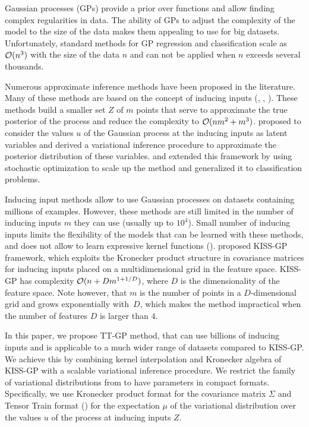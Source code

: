 Gaussian processes (GPs) provide a prior over functions and allow finding complex
regularities in data. The ability of GPs to adjust the complexity of the model
to the size of the data makes them appealing to use for big datasets.
Unfortunately, standard methods for GP regression and classification scale as
$\mathcal{O}(n^3)$ with the size of the data $n$ and can not be applied when $n$
exceeds several thousands.

Numerous approximate inference methods have been proposed in the literature. Many
of these methods are based on the concept of inducing inputs (\citet{candela2005},
\citet{snelson2006}, \citet{williams2000}). These methods build a smaller set
$Z$ of $m$ points that serve to approximate the true posterior of the process
and reduce the complexity to $\mathcal{O}(nm^2 + m^3)$. \citet{titsias2009} proposed
to consider the values $u$ of the Gaussian process at the inducing inputs
as latent variables and derived a variational inference procedure to approximate
the posterior distribution of these variables. \citet{hensman2013} and
\citet{hensman2015} extended this framework by using stochastic optimization to
scale up the method and generalized it to classification problems.

Inducing input methods allow to use Gaussian processes on datasets containing
millions of examples. However, these methods are still limited in the number
of inducing inputs $m$ they can use (usually up to $10^4$). Small number of 
inducing inputs limits the flexibility of the models that can be learned with 
these methods, and does not allow to learn expressive kernel functions 
(\citet{wilson2014}). \citet{wilson2015} proposed KISS-GP
framework, which exploits the Kronecker product structure in covariance matrices
for inducing inputs placed on a multidimensional grid in the feature space.
KISS-GP has complexity $\mathcal{O}(n + D m^{1 + 1/D})$, where $D$ is the dimensionality
of the feature space. Note however, that $m$ is the number of points in a
$D$-dimensional grid and grows exponentially with~$D$, which makes the method
impractical when the number of features $D$ is larger than $4$.

In this paper, we propose TT-GP method, that can use billions of inducing
inputs and is applicable to a much wider range of datasets compared to
KISS-GP.
We achieve this by combining kernel interpolation and Kronecker algebra of 
KISS-GP with a scalable variational inference procedure. We restrict the family of
variational distributions from \citet{hensman2013} to have parameters in
compact formats. Specifically, we use Kronecker product format for the
covariance matrix $\Sigma$ and Tensor Train format (\citet{oseledets2011}) for the
expectation $\mu$ of the variational distribution over the values $u$ of the
process at inducing inputs $Z$. 

